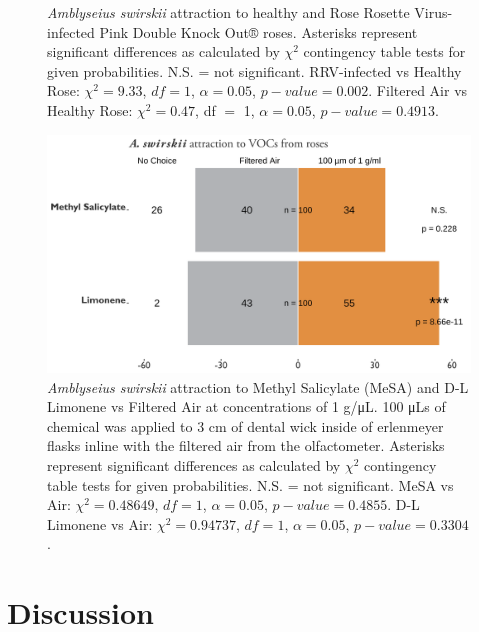 \documentclass[12pt,final,CPage]{ufthesis}
\begin{document}
{\begin{figure}
{  }

  \caption{\textit{Amblyseius swirskii} attraction to healthy and Rose Rosette Virus-infected Pink Double Knock Out® roses. Asterisks represent significant differences as calculated by $\chi^2$ contingency table tests for given probabilities. N.S. = not significant. RRV-infected vs Healthy Rose: $\chi^2 = 9.33$, $df = 1$, $\alpha = 0.05$, $p-value = 0.002$. Filtered Air vs Healthy Rose: $\chi^2 = 0.47$, df $=$ 1, $\alpha = 0.05$, $p-value = 0.4913$.}\label{fig:aswir-rrd}
  \end{figure}
  \begin{figure}

  {\centering \includegraphics[width=1\linewidth]{figure/rrv_graph_olfact_vocs} 

  }

  \caption{\textit{Amblyseius swirskii} attraction to Methyl Salicylate (MeSA) and D-L Limonene vs Filtered Air at concentrations of 1 g/\si{\micro\liter}. 100 \si{\micro\liter}s of chemical was applied to 3 cm of dental wick inside of erlenmeyer flasks inline with the filtered air from the olfactometer. Asterisks represent significant differences as calculated by $\chi^2$ contingency table tests for given probabilities. N.S. = not significant. MeSA vs Air: $\chi^2 = 0.48649$, $df = 1$, $\alpha = 0.05$, $p-value = 0.4855$. D-L Limonene vs Air: $\chi^2 = 0.94737$, $df = 1$, $\alpha = 0.05$, $p-value = 0.3304$.}\label{fig:aswir-mesa-lim}
  \end{figure}
  \hypertarget{dis-vocs-olfact}{%
  \section{Discussion}\label{dis-vocs-olfact}}

}
\end{document}
